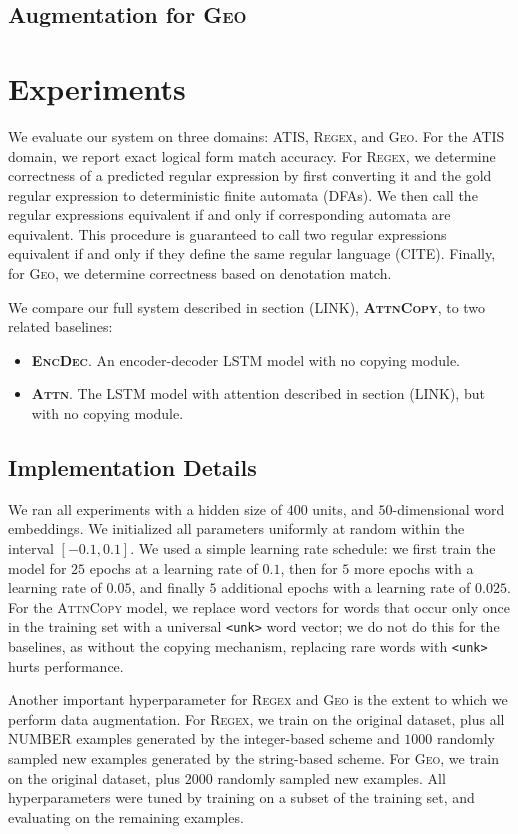 \documentclass[11pt,letterpaper]{article}
\newcommand{\encdec}{\textsc{EncDec}\xspace}
\newcommand{\attn}{\textsc{Attn}\xspace}
\newcommand{\attncopy}{\textsc{AttnCopy}\xspace}
\newcommand{\atis}{\textsc{ATIS}\xspace}
\newcommand{\regex}{\textsc{Regex}\xspace}
\newcommand{\geo}{\textsc{Geo}\xspace}
\begin{document}
\subsection{Augmentation for \geo}
\section{Experiments}
We evaluate our system on three domains: \atis, \regex, and \geo.
For the \atis domain, we report exact logical form match accuracy.
For \regex, we determine correctness of a predicted regular expression
by first converting it and the gold regular expression to
deterministic finite automata (DFAs).  We then call the regular expressions
equivalent if and only if corresponding automata are equivalent.
This procedure is guaranteed to call two regular expressions equivalent
if and only if they define the same regular language (CITE).
Finally, for \geo, we determine correctness based on denotation match.

We compare our full system described in section (LINK), \textbf{\attncopy}, 
to two related baselines:
\begin{itemize}
  \item \textbf{\encdec}.  An encoder-decoder LSTM model with no copying module.
  \item \textbf{\attn}.  The LSTM model with attention described in section (LINK),
     but with no copying module.
\end{itemize}

\subsection{Implementation Details}
We ran all experiments with a hidden size of $400$ units,
and $50$-dimensional word embeddings.
We initialized all parameters uniformly at random 
within the interval $[-0.1, 0.1]$.
We used a simple learning rate schedule:
we first train the model for $25$ epochs at a learning rate of $0.1$,
then for $5$ more epochs with a learning rate of $0.05$,
and finally $5$ additional epochs with a learning rate of $0.025$.
For the \attncopy model, we replace word vectors for words
that occur only once in the training set 
with a universal \texttt{<unk>} word vector;
we do not do this for the baselines, as without the copying mechanism,
replacing rare words with \texttt{<unk>} hurts performance.

Another important hyperparameter for \regex and \geo is the
extent to which we perform data augmentation.
For \regex, we train on the original dataset,
plus all NUMBER examples generated by the integer-based scheme
and $1000$ randomly sampled new examples generated by the string-based scheme.
For \geo, we train on the original dataset,
plus $2000$ randomly sampled new examples.
All hyperparameters were tuned by training on a subset of the
training set, and evaluating on the remaining examples.
\end{document}
